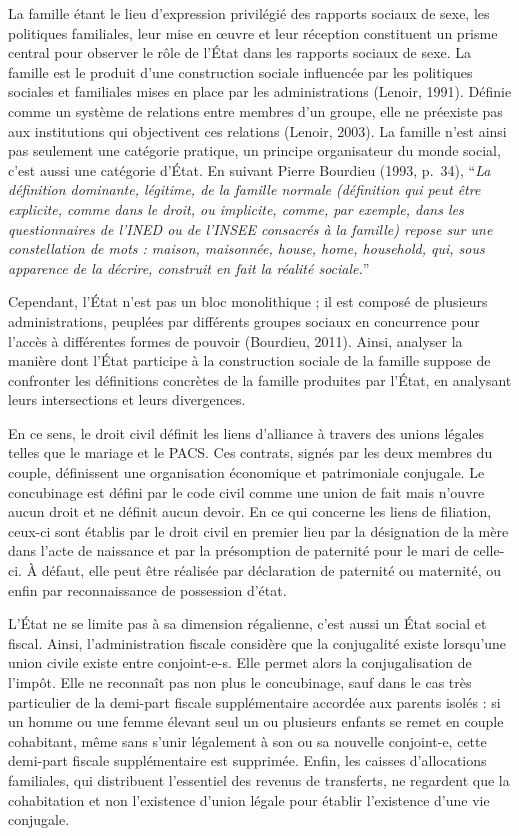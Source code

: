 \documentclass[
  12pt,
]{book}
\begin{document}
La famille étant le lieu d'expression privilégié des rapports sociaux de
sexe, les politiques familiales, leur mise en œuvre et leur réception
constituent un prisme central pour observer le rôle de l'État dans les
rapports sociaux de sexe. La famille est le produit d'une construction
sociale influencée par les politiques sociales et familiales mises en
place par les administrations (Lenoir, 1991). Définie comme un système
de relations entre membres d'un groupe, elle ne préexiste pas aux
institutions qui objectivent ces relations (Lenoir, 2003). La famille
n'est ainsi pas seulement une catégorie pratique, un principe
organisateur du monde social, c'est aussi une catégorie d'État. En
suivant Pierre Bourdieu (1993, p.~34), ``\emph{La définition dominante,
légitime, de la famille normale (définition qui peut être explicite,
comme dans le droit, ou implicite, comme, par exemple, dans les
questionnaires de l'INED ou de l'INSEE consacrés à la famille) repose
sur une constellation de mots : maison, maisonnée, house, home,
household, qui, sous apparence de la décrire, construit en fait la
réalité sociale.}''

Cependant, l'État n'est pas un bloc monolithique ; il est composé de
plusieurs administrations, peuplées par différents groupes sociaux en
concurrence pour l'accès à différentes formes de pouvoir (Bourdieu,
2011). Ainsi, analyser la manière dont l'État participe à la
construction sociale de la famille suppose de confronter les définitions
concrètes de la famille produites par l'État, en analysant leurs
intersections et leurs divergences.

En ce sens, le droit civil définit les liens d'alliance à travers des
unions légales telles que le mariage et le PACS. Ces contrats, signés
par les deux membres du couple, définissent une organisation économique
et patrimoniale conjugale. Le concubinage est défini par le code civil
comme une union de fait mais n'ouvre aucun droit et ne définit aucun
devoir. En ce qui concerne les liens de filiation, ceux-ci sont établis
par le droit civil en premier lieu par la désignation de la mère dans
l'acte de naissance et par la présomption de paternité pour le mari de
celle-ci. À défaut, elle peut être réalisée par déclaration de paternité
ou maternité, ou enfin par reconnaissance de possession d'état.

L'État ne se limite pas à sa dimension régalienne, c'est aussi un État
social et fiscal. Ainsi, l'administration fiscale considère que la
conjugalité existe lorsqu'une union civile existe entre conjoint-e-s.
Elle permet alors la conjugalisation de l'impôt. Elle ne reconnaît pas
non plus le concubinage, sauf dans le cas très particulier de la
demi-part fiscale supplémentaire accordée aux parents isolés : si un
homme ou une femme élevant seul un ou plusieurs enfants se remet en
couple cohabitant, même sans s'unir légalement à son ou sa nouvelle
conjoint-e, cette demi-part fiscale supplémentaire est supprimée. Enfin,
les caisses d'allocations familiales, qui distribuent l'essentiel des
revenus de transferts, ne regardent que la cohabitation et non
l'existence d'union légale pour établir l'existence d'une vie conjugale.
\end{document}
